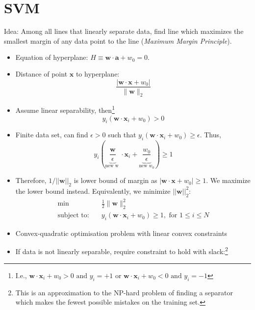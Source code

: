 \documentclass[11pt, %
	oneside, %
	english, %
	onehalfspacing, %
	parskip, %
	]{article} %
\theoremstyle{definition}
\begin{document}
\section{SVM}

Idea: Among all lines that linearly separate data, find line which maximizes the smallest margin of any data point to the line (\emph{Maximum Margin Principle}).

\begin{itemize}
	\item Equation of hyperplane: $H \equiv \mathbf{w} \cdot \mathbf{a}+w_0=0$.
	\item Distance of point $\mathbf{x}$ to hyperplane:
	\begin{equation}\label{eq.disthyperplane}
		\frac{\left|\mathbf{w} \cdot \mathbf{x}+w_0\right|}{\|\mathbf{w}\|_2}
	\end{equation}
	 \item Assume linear separability, then\footnote{I.e., $\mathbf{w} \cdot \mathbf{x}_i+w_0>0 \text { and } y_i=+1$ or $\mathbf{w} \cdot \mathbf{x}_i+w_0<0 \text { and } y_i=-1$  }
	 \begin{equation*}
		y_i\left(\mathbf{w} \cdot \mathbf{x}_i+w_0\right)>0
	 \end{equation*}
	 \item Finite data set, can find $\epsilon > 0$ such that $y_i\left(\mathbf{w} \cdot \mathbf{x}_i+w_0\right)\geq \epsilon$. Thus,
	 \begin{equation*}
		y_i(\underbrace{\frac{\mathbf{w}}{\epsilon}}_{\text {new w }} \cdot \mathbf{x}_i+\underbrace{\frac{w_0}{\epsilon}}_{\text {new } w_0}) \geq 1
	 \end{equation*}
	 \item Therefore, $1 / ||\mathbf{w}||_2$ is lower bound of margin as $|\mathbf{w} \cdot \mathbf{x}+w_0| \geq 1$. We maximize the lower bound instead. Equivalently, we minimize $||\mathbf{w}||_2^2$:
	 \begin{align*}
		\min \; & \frac{1}{2}\|\mathbf{w}\|_2^2 \\
		\text{subject to:} \quad & y_i\left(\mathbf{w} \cdot \mathbf{x}_i+w_0\right) \geq 1, \text{ for } 1 \leq i \leq N
	 \end{align*}
	 \item Convex-quadratic optimisation problem with linear convex constraints
	 \item If data is not linearly separable, require constraint to hold with slack:\footnote{This is an approximation to the NP-hard problem of finding a separator which makes the fewest possible mistakes on the training set.}

\end{itemize}
\end{document}

